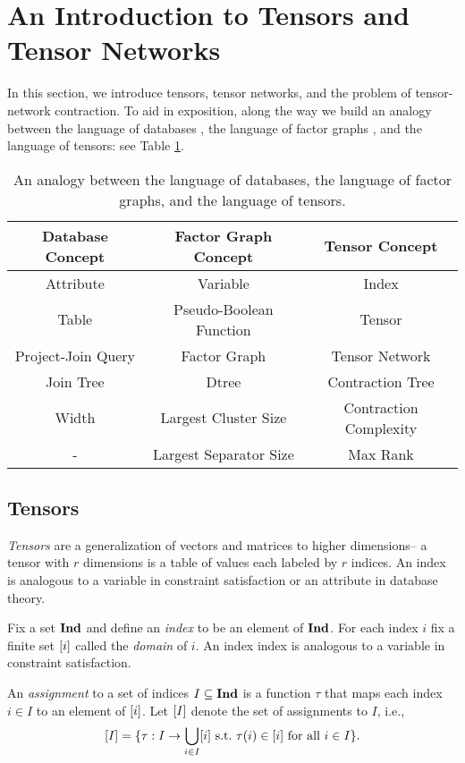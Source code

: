 \section{An Introduction to Tensors and Tensor Networks}
\label{sec:tensors:tensors}
In this section, we introduce tensors, tensor networks, and the problem of tensor-network contraction. To aid in exposition, along the way we build an analogy between the language of databases \cite{SG88}, the language of factor graphs \cite{KFL01,dechter99,darwiche01b}, and the language of tensors: see Table \ref{table:db-tensor-analogy}.

\begin{table}[t]
\centering
\begin{tabular}{c|c|c}
\hline
\textbf{Database Concept} & \textbf{Factor Graph Concept} & \textbf{Tensor Concept}\\ \hline
Attribute & Variable & Index\\
Table & Pseudo-Boolean Function & Tensor\\
Project-Join Query & Factor Graph & Tensor Network\\
Join Tree & Dtree & Contraction Tree\\ 
Width & Largest Cluster Size & Contraction Complexity \\
- & Largest Separator Size & Max Rank \\ \hline
\end{tabular}
\caption{\label{table:db-tensor-analogy} An analogy between the language of databases, the language of factor graphs, and the language of tensors.}
\end{table}

\subsection{Tensors}
\emph{Tensors} are a generalization of vectors and matrices to higher dimensions-- a tensor with $r$ dimensions is a table of values each labeled by $r$ indices. An index is analogous to a variable in constraint satisfaction or an attribute in database theory. 

Fix a set $\mathbf{Ind}$ and define an \emph{index} to be an element of $\mathbf{Ind}$. For each index $i$ fix a finite set $[i]$ called the \emph{domain} of $i$. An index index is analogous to a variable in constraint satisfaction. %

An \emph{assignment} to a set of indices $I \subseteq \mathbf{Ind}$ is a function $\tau$ that maps each index $i \in I$ to an element of $[i]$. Let $[I]$ denote the set of assignments to $I$, i.e., $$[I] = \{\tau: I \rightarrow \bigcup_{i \in I} [i]~\text{s.t.}~\tau(i) \in [i]~\text{for all}~i \in I\}.$$

